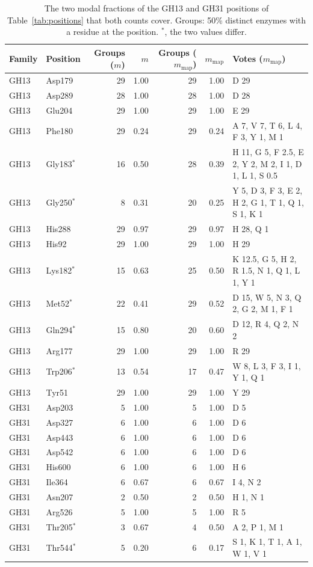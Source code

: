 \documentclass[preprint,12pt]{elsarticle}
\begin{document}
\begin{table}[h]
\centering\scriptsize\setlength{\tabcolsep}{3pt}
\caption{The two modal fractions of the GH13 and GH31 positions of Table~\ref{tab:positions} that both counts cover. Groups: 50\%
distinct enzymes with a residue at the position. $^\ast$, the two values differ.}
\label{tab:twom}
\begin{tabular}{llrrrrp{5.1cm}}
\toprule
Family & Position & Groups ($m$) & $m$ & Groups ($m_\mathrm{map}$) & $m_\mathrm{map}$ & Votes ($m_\mathrm{map}$)\\
\midrule
GH13 & Asp179 & 29 & 1.00 & 29 & 1.00 & D 29\\
GH13 & Asp289 & 28 & 1.00 & 28 & 1.00 & D 28\\
GH13 & Glu204 & 29 & 1.00 & 29 & 1.00 & E 29\\
GH13 & Phe180 & 29 & 0.24 & 29 & 0.24 & A 7, V 7, T 6, L 4, F 3, Y 1, M 1\\
GH13 & Gly183$^\ast$ & 16 & 0.50 & 28 & 0.39 & H 11, G 5, F 2.5, E 2, Y 2, M 2, I 1, D 1, L 1, S 0.5\\
GH13 & Gly250$^\ast$ & 8 & 0.31 & 20 & 0.25 & Y 5, D 3, F 3, E 2, H 2, G 1, T 1, Q 1, S 1, K 1\\
GH13 & His288 & 29 & 0.97 & 29 & 0.97 & H 28, Q 1\\
GH13 & His92 & 29 & 1.00 & 29 & 1.00 & H 29\\
GH13 & Lys182$^\ast$ & 15 & 0.63 & 25 & 0.50 & K 12.5, G 5, H 2, R 1.5, N 1, Q 1, L 1, Y 1\\
GH13 & Met52$^\ast$ & 22 & 0.41 & 29 & 0.52 & D 15, W 5, N 3, Q 2, G 2, M 1, F 1\\
GH13 & Gln294$^\ast$ & 15 & 0.80 & 20 & 0.60 & D 12, R 4, Q 2, N 2\\
GH13 & Arg177 & 29 & 1.00 & 29 & 1.00 & R 29\\
GH13 & Trp206$^\ast$ & 13 & 0.54 & 17 & 0.47 & W 8, L 3, F 3, I 1, Y 1, Q 1\\
GH13 & Tyr51 & 29 & 1.00 & 29 & 1.00 & Y 29\\
GH31 & Asp203 & 5 & 1.00 & 5 & 1.00 & D 5\\
GH31 & Asp327 & 6 & 1.00 & 6 & 1.00 & D 6\\
GH31 & Asp443 & 6 & 1.00 & 6 & 1.00 & D 6\\
GH31 & Asp542 & 6 & 1.00 & 6 & 1.00 & D 6\\
GH31 & His600 & 6 & 1.00 & 6 & 1.00 & H 6\\
GH31 & Ile364 & 6 & 0.67 & 6 & 0.67 & I 4, N 2\\
GH31 & Asn207 & 2 & 0.50 & 2 & 0.50 & H 1, N 1\\
GH31 & Arg526 & 5 & 1.00 & 5 & 1.00 & R 5\\
GH31 & Thr205$^\ast$ & 3 & 0.67 & 4 & 0.50 & A 2, P 1, M 1\\
GH31 & Thr544$^\ast$ & 5 & 0.20 & 6 & 0.17 & S 1, K 1, T 1, A 1, W 1, V 1\\
\bottomrule
\end{tabular}
\end{table}
\end{document}
